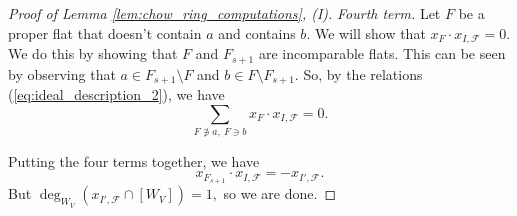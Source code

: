 \documentclass{amsart}
\theoremstyle{plain}
\theoremstyle{definition}
\begin{document}
\begin{proof}[Proof of Lemma \ref{lem:chow_ring_computations}, (I)]
\noindent
\textit{Fourth term.} Let $F$ be a proper flat that doesn't contain $a$ and contains $b$. We will show that $x_F \cdot x_{I, \mathscr{F}} = 0$. We do this by showing that $F$ and $F_{s+1}$ are incomparable flats. This can be seen by observing that $a \in F_{s+1} \setminus F$ and $b \in F \setminus F_{s+1}$. So, by the relations (\ref{eq:ideal_description_2}), we have
\begin{equation*}
\sum_{F \not\ni a,\: F \ni b}x_F \cdot x_{I,\mathscr{F}} = 0.
\end{equation*}

Putting the four terms together, we have
\begin{equation*}
x_{F_{s+1}} \cdot x_{I ,\mathscr{F}} = -x_{I' , \mathscr{F}}.
\end{equation*}
But $\deg_{W_V}(x_{I' , \mathscr{F}} \cap [W_V]) = 1,$ so we are done.
\end{proof}
\end{document}
